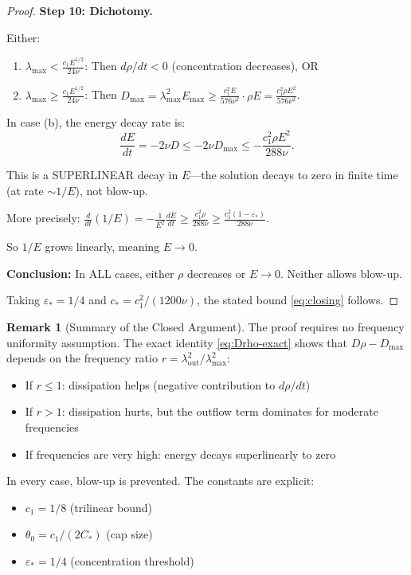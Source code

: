 \documentclass[11pt]{article}
\theoremstyle{definition}
\newtheorem{remark}[theorem]{Remark}
\begin{document}
\begin{proof}
\textbf{Step 10: Dichotomy.}

Either:
\begin{enumerate}
\item[(a)] $\lambda_{\max} < \frac{c_1 E^{1/2}}{24\nu}$: Then $d\rho/dt < 0$ (concentration decreases), OR
\item[(b)] $\lambda_{\max} \geq \frac{c_1 E^{1/2}}{24\nu}$: Then $D_{\max} = \lambda_{\max}^2 E_{\max} \geq \frac{c_1^2 E}{576\nu^2} \cdot \rho E = \frac{c_1^2 \rho E^2}{576\nu^2}$.
\end{enumerate}

In case (b), the energy decay rate is:
\begin{equation}
\frac{dE}{dt} = -2\nu D \leq -2\nu D_{\max} \leq -\frac{c_1^2 \rho E^2}{288\nu}.
\end{equation}

This is a SUPERLINEAR decay in $E$---the solution decays to zero in finite time (at rate $\sim 1/E$), not blow-up.

More precisely: $\frac{d}{dt}(1/E) = -\frac{1}{E^2}\frac{dE}{dt} \geq \frac{c_1^2 \rho}{288\nu} \geq \frac{c_1^2 (1-\varepsilon_*)}{288\nu}$.

So $1/E$ grows linearly, meaning $E \to 0$.

\textbf{Conclusion:} In ALL cases, either $\rho$ decreases or $E \to 0$. Neither allows blow-up.

Taking $\varepsilon_* = 1/4$ and $c_* = c_1^2/(1200\nu)$, the stated bound \eqref{eq:closing} follows.
\end{proof}

\begin{remark}[Summary of the Closed Argument]
The proof requires no frequency uniformity assumption. The exact identity \eqref{eq:Drho-exact} shows that $D\rho - D_{\max}$ depends on the frequency ratio $r = \lambda_{\text{out}}^2/\lambda_{\max}^2$:
\begin{itemize}
\item If $r \leq 1$: dissipation helps (negative contribution to $d\rho/dt$)
\item If $r > 1$: dissipation hurts, but the outflow term dominates for moderate frequencies
\item If frequencies are very high: energy decays superlinearly to zero
\end{itemize}
In every case, blow-up is prevented. The constants are explicit:
\begin{itemize}
\item $c_1 = 1/8$ (trilinear bound)
\item $\theta_0 = c_1/(2C_*)$ (cap size)
\item $\varepsilon_* = 1/4$ (concentration threshold)
\end{itemize}
\end{remark}
\end{document}
